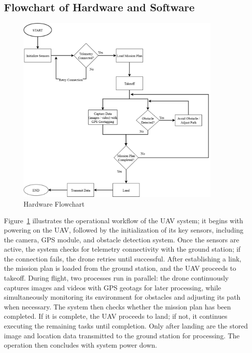 \subsection{Flowchart of Hardware and Software}

\begin{figure}[H]
	\centering
	\caption{Hardware Flowchart}
	\label{fig:HardFlow}
	\includegraphics[width=0.9\textwidth]{figures/Hard_Flow.pdf}
\end{figure}
Figure~\ref{fig:HardFlow} illustrates the operational workflow of the UAV system; it begins with powering on the UAV, followed by the initialization of its key sensors, including the camera, GPS module, and obstacle detection system. Once the sensors are active, the system checks for telemetry connectivity with the ground station; if the connection fails, the drone retries until successful. After establishing a link, the mission plan is loaded from the ground station, and the UAV proceeds to takeoff. During flight, two processes run in parallel: the drone continuously captures images and videos with GPS geotags for later processing, while simultaneously monitoring its environment for obstacles and adjusting its path when necessary. The system then checks whether the mission plan has been completed. If it is complete, the UAV proceeds to land; if not, it continues executing the remaining tasks until completion. Only after landing are the stored image and location data transmitted to the ground station for processing. The operation then concludes with system power down.

